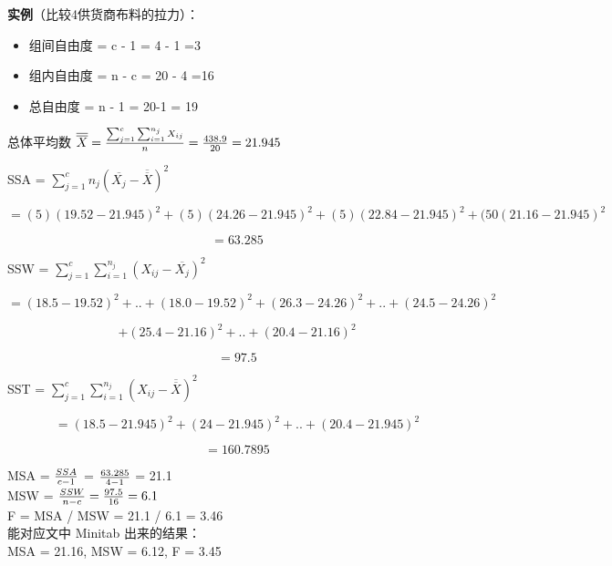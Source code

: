 \documentclass{book}        %
\providecommand{\tightlist}{%
  \setlength{\itemsep}{0pt}\setlength{\parskip}{0pt}}
\begin{document}
\textbf{实例}（比较4供货商布料的拉力）：

\begin{itemize}
\tightlist
\item
  组间自由度 = c - 1 = 4 - 1 =3
\item
  组内自由度 = n - c = 20 - 4 =16
\item
  总自由度 = n - 1 = 20-1 = 19
\end{itemize}

总体平均数
\(\overline{\overline{X}} = {\sum_{j=1}^c \sum_{i=1}^{n_j} X_{ij} \over n} = {438.9 \over 20}= 21.945\)

SSA = \(\sum_{j=1}^c n_j(\overline{X_j} - \overline{\overline{X}})^2\)

\[= (5)(19.52 - 21.945)^2 + (5)(24.26 - 21.945)^2 + (5)(22.84 - 21.945)^2 + (50(21.16 - 21.945)^2\]

\[= 63.285\]

SSW = \(\sum_{j=1}^c \sum_{i=1}^{n_j} (X_{ij} - \overline{X_j})^2\)

\[=(18.5 - 19.52)^2 + . . + (18.0 - 19.52)^2 + (26.3 - 24.26)^2 + . . + (24.5 - 24.26)^2\]

\[+(25.4 - 21.16)^2 + . . + (20.4 - 21.16)^2\]

\[= 97.5\]

SST =
\(\sum_{j=1}^c \sum_{i=1}^{n_j} (X_{ij} - \overline{\overline{X}})^2\)

\[= (18.5 - 21.945)^2 + (24 - 21.945)^2 + ..+ (20.4 - 21.945)^2\]

\[= 160.7895\]

MSA = \({SSA \over c-1}\) = \({63.285 \over 4-1}\) = 21.1\\
MSW = \({SSW \over n -c} = {97.5 \over 16}= 6.1\)\\
F = MSA / MSW = 21.1 / 6.1 = 3.46\\
能对应文中 Minitab 出来的结果：\\
MSA = 21.16, MSW = 6.12, F = 3.45\\
\end{document}
